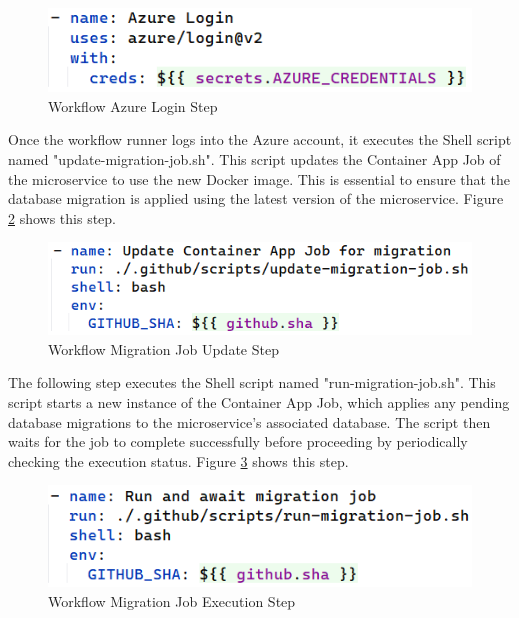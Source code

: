 \documentclass[12pt, reqno]{amsbook}
\theoremstyle{definition}
\theoremstyle{definition}
\numberwithin{section}{chapter}
\numberwithin{table}{chapter}
\numberwithin{figure}{chapter}
\begin{document}
\begin{figure}[H]
  \centering
  \includegraphics[width=0.6\linewidth]{images/GithubWorkflowAzureLogin.png}
  \caption{\label{Figure:GithubWorkflowAzureLogin}Workflow Azure Login Step}
\end{figure}

Once the workflow runner logs into the Azure account, it executes the Shell script named "update-migration-job.sh". This script updates the Container App Job of the microservice to use the new Docker image. This is essential to ensure that the database migration is applied using the latest version of the microservice. Figure \ref{Figure:GithubWorkflowMigrationJobUpdate} shows this step.

\begin{figure}[H]
  \centering
  \includegraphics[width=0.6\linewidth]{images/GithubWorkflowMigrationJobUpdate.png}
  \caption{\label{Figure:GithubWorkflowMigrationJobUpdate}Workflow Migration Job Update Step}
\end{figure}

The following step executes the Shell script named "run-migration-job.sh". This script starts a new instance of the Container App Job, which applies any pending database migrations to the microservice's associated database. The script then waits for the job to complete successfully before proceeding by periodically checking the execution status. Figure \ref{Figure:GithubWorkflowMigrationJobExecution} shows this step.

\begin{figure}[H]
  \centering
  \includegraphics[width=0.6\linewidth]{images/GithubWorkflowMigrationJobExecution.png}
  \caption{\label{Figure:GithubWorkflowMigrationJobExecution}Workflow Migration Job Execution Step}
\end{figure}
\end{document}
